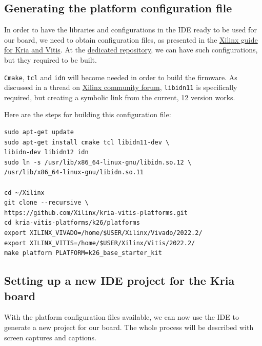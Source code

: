 \documentclass[10pt]{article}
\begin{document}
\subsection{Generating the platform configuration file}
In order to have the libraries and configurations in the IDE ready to be used for our board, we need to obtain configuration files, as presented in the 
\href{https://xilinx.github.io/kria-apps-docs/kv260/2022.1/build/html/docs/build_vitis_platform.html?highlight=xsa}{Xilinx guide for Kria and Vitis}. At the \href{https://github.com/Xilinx/kria-vitis-platforms}{dedicated repository}, we can have such configurations, but they required to be built.

\verb|Cmake|, \verb|tcl| and \verb|idn| will become needed in order to build the firmware.
As discussed in a thread on \href{https://support.xilinx.com/s/question/0D52E00006jrzsYSAQ/platform-project-cannot-be-created-on-vitis?language=en\_US}{Xilinx community forum}, \verb|libidn11| is specifically required, but creating a symbolic link from the current, 12 version works.

Here are the steps for building this configuration file:
\begin{tcolorbox}
\begin{verbatim}
sudo apt-get update
sudo apt-get install cmake tcl libidn11-dev \
libidn-dev libidn12 idn
sudo ln -s /usr/lib/x86_64-linux-gnu/libidn.so.12 \
/usr/lib/x86_64-linux-gnu/libidn.so.11

cd ~/Xilinx
git clone --recursive \
https://github.com/Xilinx/kria-vitis-platforms.git
cd kria-vitis-platforms/k26/platforms
export XILINX_VIVADO=/home/$USER/Xilinx/Vivado/2022.2/
export XILINX_VITIS=/home/$USER/Xilinx/Vitis/2022.2/
make platform PLATFORM=k26_base_starter_kit
\end{verbatim}
\end{tcolorbox}


\pagebreak
\subsection{Setting up a new IDE project for the Kria board}
With the platform configuration files available, we can now use the IDE to generate a
new project for our board. The whole process will be described with screen captures and
captions.
\end{document}
